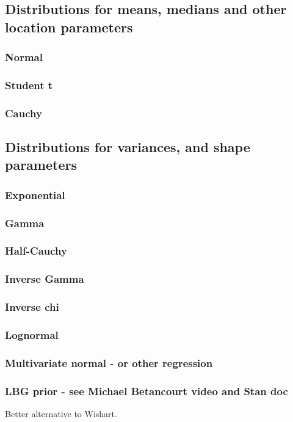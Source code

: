 \documentclass[11pt,fullpage]{book}
\begin{document}
\subsection{Distributions for means, medians and other location parameters}
\subsubsection{Normal}
\subsubsection{Student t}
\subsubsection{Cauchy}

\subsection{Distributions for variances, and shape parameters}
\subsubsection{Exponential}
\subsubsection{Gamma}\label{sec:Distributions_gamma}
\subsubsection{Half-Cauchy}
\subsubsection{Inverse Gamma}
\subsubsection{Inverse chi}
\subsubsection{Lognormal}

\subsubsection{Multivariate normal - or other regression}
\subsubsection{LBG prior - see Michael Betancourt video and Stan doc}
Better alternative to Wishart.
\end{document}
